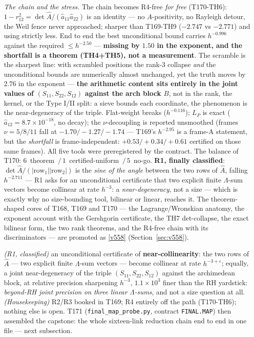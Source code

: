 \documentclass[11pt,a4paper]{article}
\begin{document}
\emph{The chain and the stress.} The chain becomes R4-free \emph{for free}
(T170-TH6): $1-r_{12}^2=\det\hat A/(\hat a_{11}\hat a_{22})$ is an identity
--- no $A$-positivity, no Rayleigh detour, the Weil fence never approached;
sharper than T169-TH9 ($-2.747$ vs $-2.771$) and using strictly less. End to
end the best unconditional bound carries $h^{-0.996}$ against the required
$\le h^{-2.50}$ --- \textbf{missing by $1.50$ in the exponent, and the
shortfall is a theorem (TH4+TH5), not a measurement}. The scramble is the
sharpest line: with scrambled positions the rank-3 collapse \emph{and} the
unconditional bounds are numerically almost unchanged, yet the truth moves
by $2.76$ in the exponent --- \textbf{the arithmetic content sits entirely in
the joint values of $(S_{11},S_{22},S_{12})$ against the arch block $B$},
not in the rank, the kernel, or the Type I/II split: a sieve bounds each
coordinate, the phenomenon is the near-degeneracy of the triple. Flat-weight
breaks ($h^{-0.116}$); $L_P$ is exact ($\hat a_{12}=8.7\times10^{-18}$, no
decay); the $\nu$-decoupling is reported unsmoothed (frames $\nu=5/8/11$
fall at $-1.70/-1.27/-1.74$ --- T169's $h^{-2.95}$ is a frame-A statement,
but the \emph{shortfall} is frame-independent: $+0.53/+0.34/+0.61$ certified
on those same frames). All five tools were preregistered by the contract.
The balance of T170: $6$~theorem~$/\,1$~certified-uniform~$/\,5$~no-go.
\textbf{R1, finally classified}: $\det\hat A/(|\mathrm{row}_1||\mathrm{row}_2|)$
is the \emph{sine of the angle} between the two rows of $\hat A$, falling
$h^{-2.711}$ --- R1 asks for an unconditional certificate that two explicit
finite $\Lambda$-sum vectors become collinear at rate $h^{-3}$: a
\emph{near-degeneracy}, not a size --- which is exactly why no
size-bounding tool, bilinear or linear, reaches it. The theorem-shaped cores
of T168, T169 and T170 --- the Lagrange/Wronskian anatomy, the exponent
account with the Gershgorin certificate, the TH7 det-collapse, the exact
bilinear form, the two rank theorems, and the R4-free chain with its
discriminators --- are promoted as \vref{v558}
 (Section~\ref{sec:v558}).

\begin{keybox}
\emph{(R1, classified)} an unconditional certificate of
\textbf{near-collinearity}: the two rows of $\hat A$ --- two explicit finite
$\Lambda$-sum vectors --- become collinear at rate $h^{-3+\varepsilon}$;
equally, a joint near-degeneracy of the triple $(S_{11},S_{22},S_{12})$
against the archimedean block, at relative precision sharpening $h^{-3}$,
$1.1\times10^{3}$ finer than the RH yardstick: \emph{beyond-RH joint
precision on three linear $\Lambda$-sums}, and not a size question at all.
\emph{(Housekeeping)} R2/R3 booked in T169; R4 entirely off the path
(T170-TH6); nothing else is open. T171 (\texttt{final\_map\_probe.py},
contract \texttt{FINAL.MAP}) then assembled the capstone: the whole
sixteen-link reduction chain end to end in one file --- next subsection.
\end{keybox}
\end{document}
